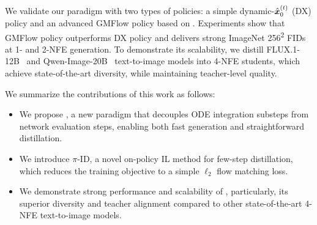 We validate our paradigm with two types of policies: a simple dynamic-$\hat{{\bm{x}}}_0^{(t)}$ (DX) policy and an advanced 
GMFlow policy based on \citet{gmflow}. Experiments show that GMFlow policy outperforms DX policy and delivers strong ImageNet 256\textsuperscript{2} FIDs at 1- and 2-NFE generation. To demonstrate its scalability, we distill FLUX.1-12B~\citep{flux2024} and Qwen-Image-20B~\citep{qwen} text-to-image models into 4-NFE \methodname{} students, which achieve state-of-the-art diversity, while maintaining teacher-level quality.

We summarize the contributions of this work as follows:
\begin{itemize}
    \item We propose \methodname{}, a new paradigm that decouples ODE integration substeps from network evaluation steps, enabling both fast generation and straightforward distillation.
    \item We introduce $\pi$-ID, a novel on-policy IL method for few-step \methodname{} distillation, which reduces the training objective to a simple $\ell_2$ flow matching loss.
    \item We demonstrate strong performance and scalability of \methodname{}, particularly, its superior diversity and teacher alignment compared to other state-of-the-art 4-NFE text-to-image models.
\end{itemize}
